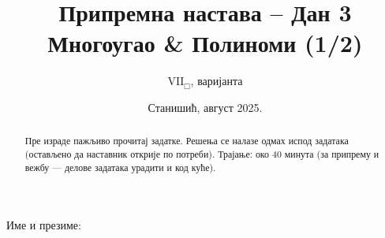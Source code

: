\documentclass[10pt,a5paper,addpoints]{exam}
\title{Припремна настава – Дан 3\\ \small Многоугао \& Полиноми (1/2)}
\author{$\mathrm{VII}_\Box$, варијанта \variant{1}{2}{3}}
\date{Станишић, август 2025.}
\begin{document}
\maketitle
\thispagestyle{headandfoot}

\noindent Име и презиме:\enspace\underline{\makebox[0.45\textwidth][s]{\hfill}}

\begin{flushleft}
\gradetable[h]
\end{flushleft}

\begin{abstract}
Пре израде пажљиво прочитај задатке. Решења се налазе одмах испод задатака (остављено да наставник открије по потреби). Трајање: око 40 минута (за припрему и вежбу — делове задатака урадити и код куће).
\end{abstract}
\end{document}
